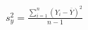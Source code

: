 \documentclass[preview]{standalone}
\begin{document}
\begin{align*}
s^2_y = \frac{\sum_{i=1}^{n} (Y_i - \overline{Y})^2}{n - 1}
\end{align*}
\end{document}
